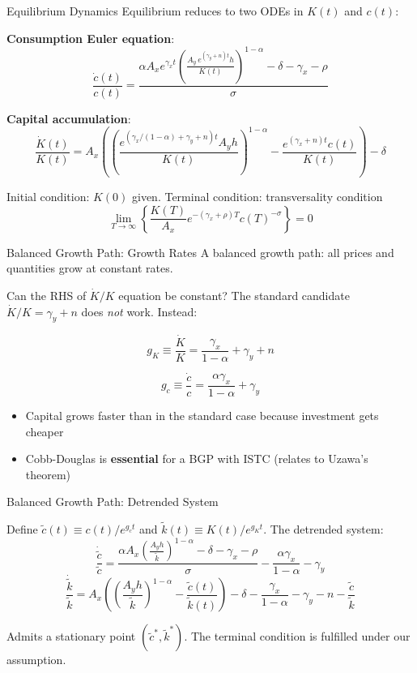 \documentclass[blue]{beamer}
\begin{document}
\begin{frame}{Equilibrium Dynamics}
	Equilibrium reduces to two ODEs in $K(t)$ and $c(t)$:
	
	\textbf{Consumption Euler equation}:
	\[
	\frac{\dot{c}(t)}{c(t)} = \frac{\alpha A_x e^{\gamma_xt}\left(\frac{A_y\, e^{(\gamma_y+n)t} h}{K(t)}\right)^{\!1-\alpha} - \delta - \gamma_x - \rho}{\sigma} 
	\]
	
	\textbf{Capital accumulation}:
	\[
	\frac{\dot{K}(t)}{K(t)} = A_x\left( \left(\frac{e^{(\gamma_x/(1-\alpha)+\gamma_y+n)t}A_y h}{K(t)}\right)^{\!1-\alpha} - \frac{e^{(\gamma_x+n)t} c(t)}{K(t)}\right) - \delta
	\]
	
	Initial condition: $K(0)$ given. Terminal condition: transversality condition
	$$
	\lim_{T\rightarrow\infty}\left\{\frac{K(T)}{A_x}e^{-(\gamma_x +\rho)T}c(T)^{-\sigma}\right\}=0
	$$
\end{frame}

\begin{frame}{Balanced Growth Path: Growth Rates}
	A balanced growth path: all prices and quantities grow at constant rates.
	
	\medskip
	Can the RHS of $\dot{K}/K$ equation be constant? The standard candidate $\dot{K}/K = \gamma_y + n$ does \emph{not} work. Instead:
	
	\[
	g_K \equiv \frac{\dot{K}}{K} = \frac{\gamma_x}{1-\alpha} + \gamma_y + n
	\]
	
	\[
	g_c \equiv \frac{\dot{c}}{c} = \frac{\alpha\gamma_x}{1-\alpha} + \gamma_y
	\]
	
	\begin{itemize}
		\item Capital grows faster than in the standard case because investment gets cheaper
		\item Cobb-Douglas is \textbf{essential} for a BGP with ISTC (relates to Uzawa's theorem)
	\end{itemize}
\end{frame}

\begin{frame}{Balanced Growth Path: Detrended System}
	
	Define $\tilde{c}(t) \equiv c(t)/e^{g_c t}$ and $\tilde{k}(t) \equiv K(t)/e^{g_K t}$. The detrended system:
	$$
		\frac{\dot{\tilde{c}}}{\tilde{c}} = \frac{\alpha A_x\!\left(\frac{A_y h}{\tilde{k}}\right)^{1-\alpha} - \delta - \gamma_x - \rho}{\sigma} - \frac{\alpha\gamma_x}{1-\alpha} - \gamma_y 
	$$
	$$
		\frac{\dot{\tilde{k}}}{\tilde{k}} = A_x\left(\left(\frac{A_y h}{\tilde{k}}\right)^{1-\alpha}-\frac{\tilde{c}(t)}{\tilde{k}(t)}\right) - \delta - \frac{\gamma_x}{1-\alpha} - \gamma_y - n - \frac{\tilde{c}}{\tilde{k}} 
		$$
	
	Admits a stationary point $(\tilde{c}^*, \tilde{k}^*)$. The terminal condition is fulfilled under our assumption.
\end{frame}
\end{document}
